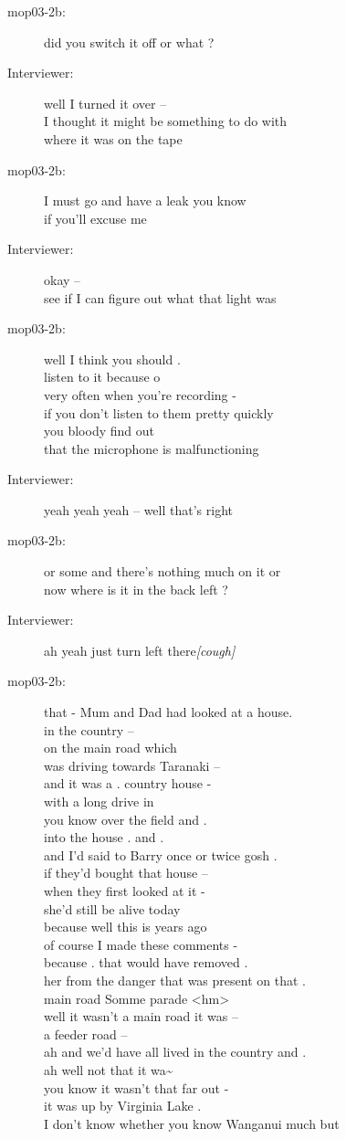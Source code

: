 \documentclass{article}
\newcommand{\turn}[2]{
\item[#1:] #2
}
\begin{document}
\begin{description}
\turn{mop03-2b}{did you switch it off or what ?}

\turn{Interviewer}{well I turned it over --\\
I thought it might be something to do with\\
where it was on the tape}

\turn{mop03-2b}{I must go and have a leak you know\\
if you'll excuse me}

\turn{Interviewer}{okay --\\
see if I can figure out what that light was}

\turn{mop03-2b}{well I think you should .\\
listen to it because o\\
very often when you're recording -\\
if you don't listen to them pretty quickly\\
you bloody find out\\
that the microphone is malfunctioning}

\turn{Interviewer}{yeah yeah yeah -- well that's right}

\turn{mop03-2b}{or some and there's nothing much on it or \\
now where is it in the back left ?}

\turn{Interviewer}{ah yeah just turn left there\textit{[cough]} \\
}

\turn{mop03-2b}{that - Mum and Dad had looked at a house.\\
in the country --\\
on the main road which\\
was driving towards Taranaki --\\
and it was a . country house -\\
with a long drive in\\
you know over the field and .\\
into the house . and .\\
and I'd said to Barry once or twice gosh .\\
if they'd bought that house --\\
when they first looked at it -\\
she'd still be alive today\\
because well this is years ago\\
of course I made these comments -\\
because . that would have removed .\\
her from the danger that was present on that .\\
main road Somme parade \textless hm\textgreater \\
well it wasn't a main road it was --\\
a feeder road --\\
ah and we'd have all lived in the country and .\\
ah well not that it wa\~{} \\
you know it wasn't that far out -\\
it was up by Virginia Lake .\\
I don't know whether you know Wanganui much but}


\end{description}
\end{document}
